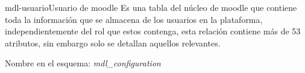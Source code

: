     \begin{cdtEntidad}{mdl-usuario}{Usuario de moodle}{%
    Es una tabla del núcleo de moodle que contiene toda la información que se
    almacena de los usuarios en la plataforma, independientemente del rol que
    estos contenga, esta relación contiene más de 53 atributos, sin embargo solo
    se detallan aquellos relevantes.}


    \end{cdtEntidad}
    \vspace{-1em}\hfill Nombre en el esquema: {\it mdl\_configuration}\ \ \par%

